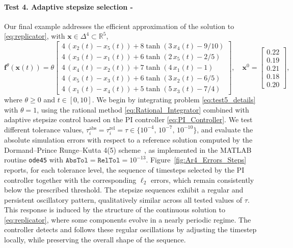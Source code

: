 \documentclass[11pt,letterpaper]{article}
\theoremstyle{remark}
\begin{document}
\paragraph{Test 4. Adaptive stepsize selection -}\label{test4}\!\!\!\!Our final example addresses the efficient approximation of the solution to \eqref{eq:replicator}, with $\bm{x} \in \Delta^4 \subset \mathbb{R}^5$,
\begin{equation}\label{eq:test5_details}
    \bm{f}^\theta \! (\bm{x}(t)) \!  = \! \theta\begin{bmatrix}
        4 \, (x_2(t) - x_5(t)) + 8 \tanh(3 \, x_4(t) - 9/10) \\
        4 \, (x_3(t) - x_1(t)) + 6 \tanh(2 \, x_5(t) - 2/5) \phantom{.} \\
        4 \, (x_4(t) - x_2(t)) + 7 \tanh(4 \, x_1(t) - 1) \phantom{/5.} \\
        4 \, (x_5(t) - x_3(t)) + 6 \tanh(3 \, x_2(t) - 6/5) \phantom{.} \\
        4 \, (x_1(t) - x_4(t)) + 5 \tanh(5 \, x_3(t) - 7/4) \phantom{.}
    \end{bmatrix},  \quad \bm{x}^0 \!  = \!  \begin{bmatrix}
        0.22 \\ 0.19 \\  0.21 \\ 0.18 \\ 0.20
    \end{bmatrix},
\end{equation}
where $\theta \geq 0$ and $t \in [0,10]$. We begin by integrating problem \eqref{eq:test5_details} with $\theta = 1$, using the rational method \eqref{eq:Rational_Integrator} combined with adaptive stepsize control based on the PI controller \eqref{eq:PI_Controller}. We test different tolerance values, $\tau_i^{\text{abs}} = \tau_i^{\text{rel}} =\tau \in \{10^{-4}, \, 10^{-7}, \, 10^{-10}\}$, and evaluate the absolute simulation errors with respect to a reference solution computed by the Dormand--Prince Runge--Kutta 4(5) scheme~\cite{dormand1980}, as implemented in the MATLAB routine \texttt{ode45} with $\texttt{AbsTol}=\texttt{RelTol}=10^{-13}$. Figure~\ref{fig:Ar4_Errors_Steps} reports, for each tolerance level, the sequence of timesteps selected by the PI controller together with the corresponding $\ell_2$ errors, which remain consistently below the prescribed threshold. The stepsize sequences exhibit a regular and persistent oscillatory pattern, qualitatively similar across all tested values of $\tau$. This response is induced by the structure of the continuous solution to \eqref{eq:replicator}, where some components evolve in a nearly periodic regime. The controller detects and follows these regular oscillations by adjusting the timestep locally, while preserving the overall shape of the sequence.
\end{document}
